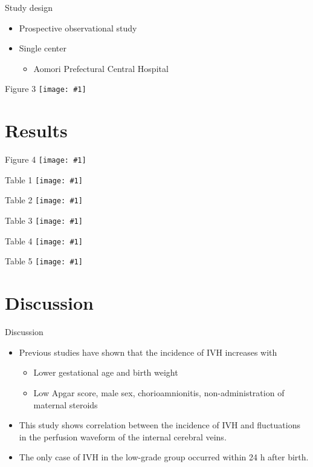 \documentclass{beamer}
\newcommand*{\solo}[1]{\centering\texttt{[image: \#1]}}
\begin{document}
\begin{frame}{Study design}
    \begin{itemize}
        \item Prospective observational study
        \item Single center
            \begin{itemize}
                \item Aomori Prefectural Central Hospital
            \end{itemize}
    \end{itemize}
\end{frame}

\begin{frame}{Figure 3}
    \solo{F3.png}
\end{frame}

\section{Results}
\begin{frame}{Figure 4}
    \solo{F4.png}
\end{frame}

\begin{frame}{Table 1}
    \solo{T1.eps}
\end{frame}

\begin{frame}{Table 2}
    \solo{T2.eps}
\end{frame}

\begin{frame}{Table 3}
    \solo{T3.eps}
\end{frame}

\begin{frame}{Table 4}
    \solo{T4.eps}
\end{frame}

\begin{frame}{Table 5}
    \solo{T5.eps}
\end{frame}

\section{Discussion}
\begin{frame}{Discussion}
    \begin{itemize}
        \item Previous studies have shown that the incidence of IVH increases with
            \begin{itemize}
                \item Lower gestational age and birth weight
                \item Low Apgar score, male sex, chorioamnionitis, non-administration of maternal steroids
            \end{itemize}
        \item This study shows correlation between the incidence of IVH and
            fluctuations in the perfusion waveform of the internal cerebral
            veins.
        \item The only case of IVH in the low-grade group occurred within 24 h
            after birth.
    \end{itemize}
\end{frame}
\end{document}
